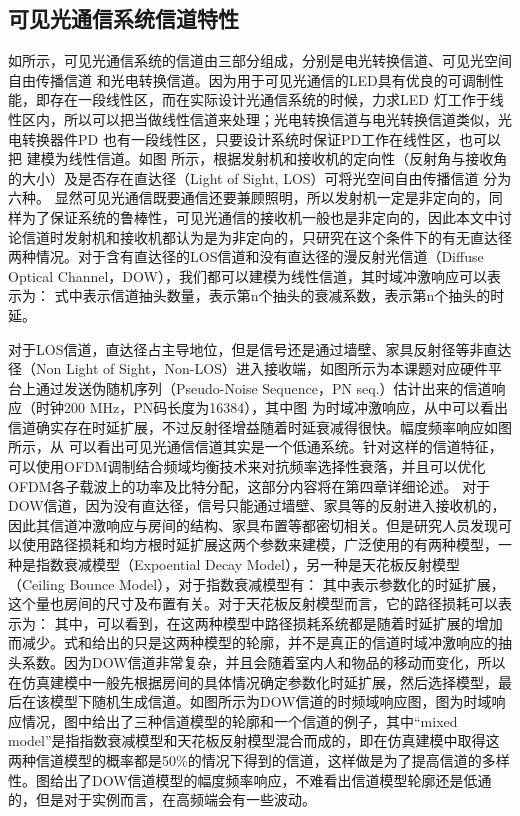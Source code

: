 \subsection{可见光通信系统信道特性}\label{subsection:Channel}
如所示，可见光通信系统的信道由三部分组成，分别是电光转换信道、可见光空间自由传播信道 和光电转换信道。因为用于可见光通信的LED具有优良的可调制性能，即存在一段线性区，而在实际设计光通信系统的时候，力求LED 灯工作于线性区内，所以可以把当做线性信道来处理；光电转换信道与电光转换信道类似，光电转换器件PD 也有一段线性区，只要设计系统时保证PD工作在线性区，也可以把 建模为线性信道。如图 所示，根据发射机和接收机的定向性（反射角与接收角的大小）及是否存在直达径（Light of Sight, LOS）可将光空间自由传播信道 分为六种。
显然可见光通信既要通信还要兼顾照明，所以发射机一定是非定向的，同样为了保证系统的鲁棒性，可见光通信的接收机一般也是非定向的，因此本文中讨论信道时发射机和接收机都认为是为非定向的，只研究在这个条件下的有无直达径两种情况。对于含有直达径的LOS信道和没有直达径的漫反射光信道（Diffuse Optical Channel，DOW），我们都可以建模为线性信道，其时域冲激响应可以表示为：
式中表示信道抽头数量，表示第n个抽头的衰减系数，表示第n个抽头的时延。

对于LOS信道，直达径占主导地位，但是信号还是通过墙壁、家具反射径等非直达径（Non Light of Sight，Non-LOS）进入接收端，如图所示为本课题对应硬件平台上通过发送伪随机序列（Pseudo-Noise Sequence，PN seq.）估计出来的信道响应（时钟200 MHz，PN码长度为16384），其中图
为时域冲激响应，从中可以看出信道确实存在时延扩展，不过反射径增益随着时延衰减得很快。幅度频率响应如图
所示，从
可以看出可见光通信信道其实是一个低通系统。针对这样的信道特征，可以使用OFDM调制结合频域均衡技术来对抗频率选择性衰落，并且可以优化OFDM各子载波上的功率及比特分配，这部分内容将在第四章详细论述。
对于DOW信道，因为没有直达径，信号只能通过墙壁、家具等的反射进入接收机的，因此其信道冲激响应与房间的结构、家具布置等都密切相关。但是研究人员发现可以使用路径损耗和均方根时延扩展这两个参数来建模\cite{carruthers1997modeling}，广泛使用的有两种模型，一种是指数衰减模型（Expoential Decay Model），另一种是天花板反射模型（Ceiling Bounce Model），对于指数衰减模型有：
其中表示参数化的时延扩展，这个量也房间的尺寸及布置有关。对于天花板反射模型而言，它的路径损耗可以表示为：
其中，可以看到，在这两种模型中路径损耗系统都是随着时延扩展的增加而减少。式和给出的只是这两种模型的轮廓，并不是真正的信道时域冲激响应的抽头系数。因为DOW信道非常复杂，并且会随着室内人和物品的移动而变化，所以在仿真建模中一般先根据房间的具体情况确定参数化时延扩展，然后选择模型，最后在该模型下随机生成信道。如图所示为DOW信道的时频域响应图，图为时域响应情况，图中给出了三种信道模型的轮廓和一个信道的例子，其中“mixed model”是指指数衰减模型和天花板反射模型混合而成的，即在仿真建模中取得这两种信道模型的概率都是50\%的情况下得到的信道，这样做是为了提高信道的多样性。图给出了DOW信道模型的幅度频率响应，不难看出信道模型轮廓还是低通的，但是对于实例而言，在高频端会有一些波动。


